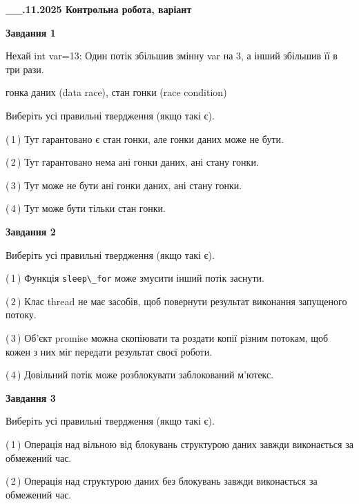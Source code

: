 \documentclass[12pt, ukrainian]{article}
\def\code#1{\Verb!#1!}
\begin{document}
\begin {large}

\textbf{\_\_.11.2025 Контрольна робота, варіант  }\par


{

\begin{center}
\textbf{Завдання 1}
\end{center}
Нехай int var=13; Один потік збільшив змінну var на 3, а інший збільшив її в три рази.

гонка даних (data race), стан гонки (race condition)

Виберіть усі правильні твердження (якщо такі є).\par
\vspace{2mm}
(\,1\,) Тут гарантовано є стан гонки, але гонки даних може не бути.%

(\,2\,) Тут гарантовано нема ані гонки даних, ані стану гонки.%

(\,3\,) Тут може не бути ані гонки даних, ані стану гонки.%

(\,4\,) Тут може бути тільки стан гонки.%



\begin{center}
\textbf{Завдання 2}
\end{center}
Виберіть усі правильні твердження (якщо такі є).\par
\vspace{2mm}

(\,1\,) Функція \code{sleep\_for} може змусити інший потік заснути.%

(\,2\,) Клас thread не має засобів, щоб повернути результат виконання запущеного потоку.%

(\,3\,) Об’єкт promise можна скопіювати та роздати копії різним потокам, щоб кожен з них міг передати результат своєї роботи.%

(\,4\,) Довільний потік може розблокувати заблокований м’ютекс.%



\begin{center}
\textbf{Завдання 3}
\end{center}
Виберіть усі правильні твердження (якщо такі є).\par
\vspace{2mm}

(\,1\,) Операція над вільною від блокувань структурою даних завжди виконається за обмежений час.%

(\,2\,) Операція над структурою даних без блокувань завжди виконається за обмежений час.%

}
\end{large}
\end{document}
